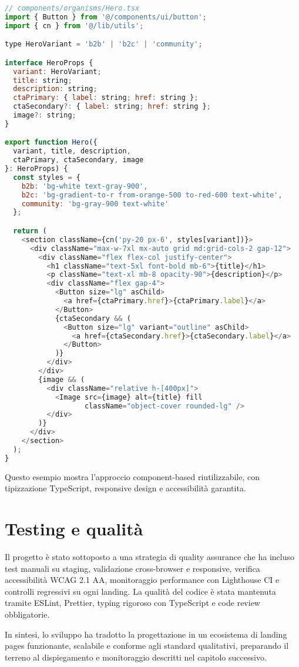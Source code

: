\begin{lstlisting}[language=JavaScript, caption=Hero Component con varianti]
// components/organisms/Hero.tsx
import { Button } from '@/components/ui/button';
import { cn } from '@/lib/utils';

type HeroVariant = 'b2b' | 'b2c' | 'community';

interface HeroProps {
  variant: HeroVariant;
  title: string;
  description: string;
  ctaPrimary: { label: string; href: string };
  ctaSecondary?: { label: string; href: string };
  image?: string;
}

export function Hero({
  variant, title, description,
  ctaPrimary, ctaSecondary, image
}: HeroProps) {
  const styles = {
    b2b: 'bg-white text-gray-900',
    b2c: 'bg-gradient-to-r from-orange-500 to-red-600 text-white',
    community: 'bg-gray-900 text-white'
  };

  return (
    <section className={cn('py-20 px-6', styles[variant])}>
      <div className="max-w-7xl mx-auto grid md:grid-cols-2 gap-12">
        <div className="flex flex-col justify-center">
          <h1 className="text-5xl font-bold mb-6">{title}</h1>
          <p className="text-xl mb-8 opacity-90">{description}</p>
          <div className="flex gap-4">
            <Button size="lg" asChild>
              <a href={ctaPrimary.href}>{ctaPrimary.label}</a>
            </Button>
            {ctaSecondary && (
              <Button size="lg" variant="outline" asChild>
                <a href={ctaSecondary.href}>{ctaSecondary.label}</a>
              </Button>
            )}
          </div>
        </div>
        {image && (
          <div className="relative h-[400px]">
            <Image src={image} alt={title} fill
                   className="object-cover rounded-lg" />
          </div>
        )}
      </div>
    </section>
  );
}
\end{lstlisting}

Questo esempio mostra l’approccio component-based riutilizzabile, con
tipizzazione TypeScript, responsive design e accessibilità garantita.

\section{Testing e qualità}
Il progetto è stato sottoposto a una strategia di quality assurance che ha
incluso test manuali su staging, validazione cross-browser e responsive,
verifica accessibilità WCAG 2.1 AA, monitoraggio performance con Lighthouse CI e
controlli regressivi su ogni landing.  
La qualità del codice è stata mantenuta tramite ESLint, Prettier, typing
rigoroso con TypeScript e code review obbligatorie.  

\bigskip
In sintesi, lo sviluppo ha tradotto la progettazione in un ecosistema di landing
pages funzionante, scalabile e conforme agli standard qualitativi, preparando il
terreno al dispiegamento e monitoraggio descritti nel capitolo successivo.

